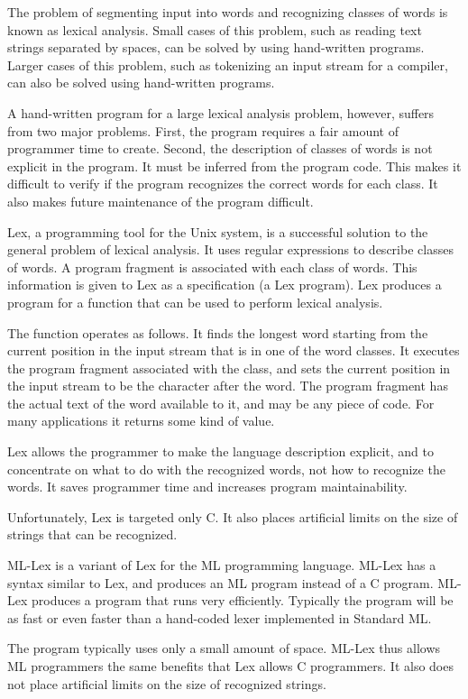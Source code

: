The problem of segmenting input into words and recognizing classes of
words is known as lexical analysis.  Small cases of this problem,
such as reading text strings separated by spaces, can be solved by
using hand-written programs.  Larger cases of this problem, such as
tokenizing an input stream for a compiler, can also be solved using
hand-written programs.

A hand-written program for a large lexical analysis problem, however,
suffers from two major problems.  First, the program requires a fair
amount of programmer time to create.  Second, the description of
classes of words is not explicit in the program.  It must be inferred
from the program code.  This makes it difficult to verify if the
program recognizes the correct words for each class.  It also makes
future maintenance of the program difficult.

Lex, a programming tool for the Unix system, is a successful solution
to the general problem of lexical analysis.  It uses regular
expressions to describe classes of words.  A program fragment is
associated with each class of words.  This information is given to
Lex as a specification (a Lex program).  Lex produces a program for a
function that can be used to perform lexical analysis.

The function operates as follows.  It finds the longest word starting
from the current position in the input stream that is in one of the
word classes.  It executes the program fragment associated with the
class, and sets the current position in the input stream to be the
character after the word.  The program fragment has the actual text
of the word available to it, and may be any piece of code.  For many
applications it returns some kind of value.

Lex allows the programmer to make the language description explicit,
and to concentrate on what to do with the recognized words, not how
to recognize the words.  It saves programmer time and increases
program maintainability.

Unfortunately, Lex is targeted only C.  It also places artificial
limits on the size of strings that can be recognized.

ML-Lex is a variant of Lex for the ML programming language.  ML-Lex
has a syntax similar to Lex, and produces an ML program instead of a
C program.  ML-Lex produces a program that runs very efficiently.
Typically the program will be as fast or even faster than a
hand-coded lexer implemented in Standard ML.

The program typically uses only a small amount of space.
ML-Lex thus allows ML programmers the same benefits that Lex allows C
programmers.  It also does not place artificial limits on the size of
recognized strings.

